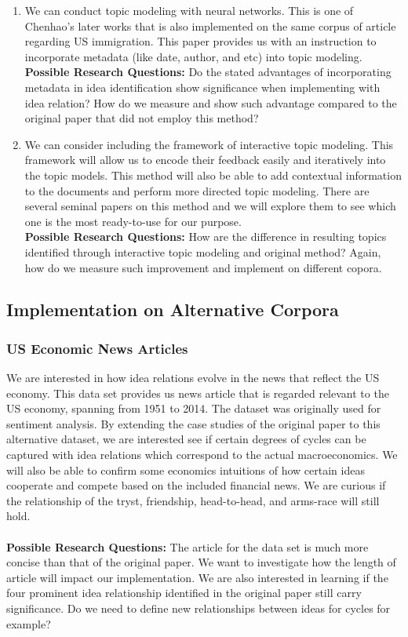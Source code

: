 \documentclass{article}
\begin{document}
\begin{enumerate}
  \item We can conduct topic modeling with neural networks. This is one of Chenhao's later works that is also implemented on the same corpus of article regarding US immigration. This paper provides us with an instruction to incorporate metadata (like date, author, and etc) into topic modeling. \cite{chenhao}
  \\
  \textbf{Possible Research Questions:} Do the stated advantages of incorporating metadata in idea identification show significance when implementing with idea relation? How do we measure and show such advantage compared to the original paper that did not employ this method? 
  
  \item We can consider including the framework of interactive topic modeling. \cite{interactive} This framework will allow us to encode their feedback easily and iteratively into the topic models. This method will also be able to add contextual information to the documents and perform more directed topic modeling. There are several seminal papers on this method and we will explore them to see which one is the most ready-to-use for our purpose. \cite{interactivec} \cite{interactiveb}
  \\
  \textbf{Possible Research Questions:} How are the difference in resulting topics identified through interactive topic modeling and original method? Again, how do we measure such improvement and implement on different copora.
\end{enumerate}  


\subsection{Implementation on Alternative Corpora}
\subsubsection{US Economic News Articles}
We are interested in how idea relations evolve in the news that reflect the US economy. This data set provides us news article that is regarded relevant to the US economy, spanning from 1951 to 2014. \cite{econnews} The dataset was originally used for sentiment analysis. By extending the case studies of the original paper to this alternative dataset, we are interested see if certain degrees of cycles can be captured with idea relations which correspond to the actual macroeconomics. We will also be able to confirm some economics intuitions of how certain ideas cooperate and compete based on the included financial news. We are curious if the relationship of the tryst, friendship, head-to-head, and arms-race will still hold.
\\ \\
\textbf{Possible Research Questions:} The article for the data set is much more concise than that of the original paper. We want to investigate how the length of article will impact our implementation. We are also interested in learning if the four prominent idea relationship identified in the original paper still carry significance. Do we need to define new relationships between ideas for cycles for example?
\end{document}
